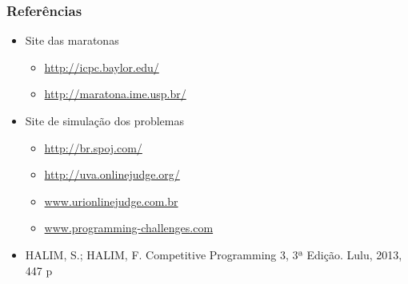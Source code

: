 \begin{frame}
  \frametitle{Referências}
  \begin{itemize}
    \item Site das maratonas
    \begin{itemize}
      \item \url{http://icpc.baylor.edu/}
      \item \url{http://maratona.ime.usp.br/}
    \end{itemize}
    \item Site de simulação dos problemas
    \begin{itemize}
      \item \url{http://br.spoj.com/}
      \item \url{http://uva.onlinejudge.org/}
      \item \url{www.urionlinejudge.com.br}
      \item \url{www.programming-challenges.com}
    \end{itemize}
   \item HALIM, S.; HALIM, F. Competitive Programming 3, 3ª Edição. Lulu, 2013, 447 p
  \end{itemize}
\end{frame}